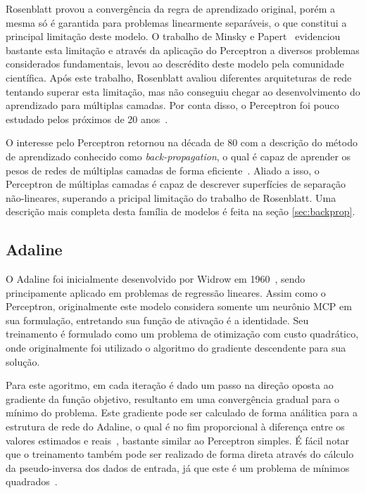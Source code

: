 \documentclass[conference]{IEEEtran}
\begin{document}
	Rosenblatt provou a convergência da regra de aprendizado original, porém a mesma só é garantida para problemas linearmente separáveis, o que constitui a principal limitação deste modelo. O trabalho de Minsky e Papert~\cite{minsky1969introduction} evidenciou bastante esta limitação e através da aplicação do Perceptron a diversos problemas considerados fundamentais, levou ao descrédito deste modelo pela comunidade científica. Após este trabalho, Rosenblatt avaliou diferentes arquiteturas de rede tentando superar esta limitação, mas não conseguiu chegar ao desenvolvimento do aprendizado para múltiplas camadas. Por conta disso, o Perceptron foi pouco estudado pelos próximos de 20 anos~\cite{hertz1991introduction}.
	
	O interesse pelo Perceptron retornou na década de 80 com a descrição do método de aprendizado conhecido como \textit{back-propagation}, o qual é capaz de aprender os pesos de redes de múltiplas camadas de forma eficiente~\cite{rumelhart1985learning}. Aliado a isso, o Perceptron de múltiplas camadas é capaz de descrever superfícies de separação não-lineares, superando a pricipal limitação do trabalho de Rosenblatt. Uma descrição mais completa desta família de modelos é feita na seção \ref{sec:backprop}.

	\subsection{Adaline}
	O Adaline foi inicialmente desenvolvido por Widrow em 1960~\cite{widrow1960adaptive}, sendo principamente aplicado em problemas de regressão lineares. Assim como o Perceptron, originalmente este modelo considera somente um neurônio MCP em sua formulação, entretando sua função de ativação é a identidade. Seu treinamento é formulado como um problema de otimização com custo quadrático, onde originalmente foi utilizado o algoritmo do gradiente descendente para sua solução. 
	
	Para este agoritmo, em cada iteração é dado um passo na direção oposta ao gradiente da função objetivo, resultanto em uma convergência gradual para o mínimo do problema. Este gradiente pode ser calculado de forma análitica para a estrutura de rede do Adaline, o qual é no fim proporcional à diferença entre os valores estimados e reais~\cite{widrow1960adaptive}, bastante similar ao Perceptron simples. É fácil notar que o treinamento também pode ser realizado de forma direta através do cálculo da pseudo-inversa dos dados de entrada, já que este é um problema de mínimos quadrados~\cite{haykin2007neural}.
	
\end{document}
